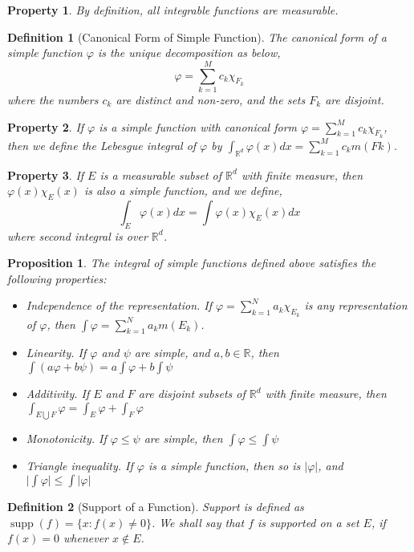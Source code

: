 \documentclass{report}
\theoremstyle{upthm}
\newtheorem{defn}{Definition}
\newtheorem{prop}{Proposition}
\newtheorem{property}{Property}
\newcommand{\reals}{\mathbb{R}}
\newcommand{\set}[1]{\big\lbrace #1 \big\rbrace}
\newcommand{\union}{\bigcup}
\newcommand{\vl}{\Big|}
\newcommand{\supp}{\mathop{\text{supp}}}
\begin{document}
\begin{property}
	By definition, all integrable functions are measurable.
\end{property}

\begin{defn}[Canonical Form of Simple Function]
	The canonical form of a simple function $\varphi$ is the unique decomposition as below,
	$$  \varphi = \sum_{k=1}^{M} c_k \chi_{F_k}  $$
	 where the numbers $c_k$ are distinct and non-zero, and the sets $F_k$ are disjoint.
\end{defn}
\begin{property}
	If $\varphi$ is a simple function with canonical form $  \varphi = \sum_{k=1}^{M} c_k \chi_{F_k}  $, then we define the Lebesgue integral of $\varphi$ by $\int_{\reals^d}^{} \varphi(x) dx = \sum_{k=1}^{M} c_k m(Fk)$.
\end{property}
\begin{property}
	If $E$ is a measurable subset of $\reals^d$ with finite measure, then $ \varphi(x) \chi_E(x)$
	is also a simple function, and we define,
	$$ \int_{E} \varphi(x) dx = \int \varphi(x) \chi_E(x) dx $$
	where second integral is over $\reals^d$.
\end{property}

\begin{prop}
	The integral of simple functions defined above satisfies the following properties:
	\begin{itemize}
		\item Independence of the representation. If $ \varphi = \sum_{k=1}^{N} a_k \chi_{E_k}$ is any representation of $\varphi$, then $ \int \varphi = \sum_{k=1}^{N} a_k m(E_k) $.
		\item Linearity. If $\varphi$ and $\psi$ are simple, and $a, b \in \reals$, then $\int (a \varphi + b \psi) = a \int \varphi + b \int \psi $
		\item Additivity. If $E$ and $F$ are disjoint subsets of $\reals^d$ with finite measure, then $ \int_{E \union F} \varphi = \int_{E} \varphi + \int_{F} \varphi $
		\item Monotonicity. If $\varphi  \leq \psi$ are simple, then $ \int \varphi \leq \int \psi$
		\item Triangle inequality. If $\varphi$ is a simple function, then so is $|\varphi|$, and $ \vl \int \varphi \vl \leq \int | \varphi |  $
	\end{itemize}
\end{prop}

\begin{defn}[Support of a Function]
	Support is defined as $\supp(f) = \set{x : f(x) \neq 0} $. We shall say that $f$ is supported on a set $E$, if $f(x) = 0$ whenever $x \notin E$.
\end{defn}
\end{document}
